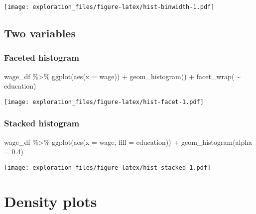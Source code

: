 \documentclass[
]{book}
\newenvironment{Shaded}{\begin{snugshade}}{\end{snugshade}}
\newcommand{\AttributeTok}[1]{\textcolor[rgb]{0.77,0.63,0.00}{#1}}
\newcommand{\FloatTok}[1]{\textcolor[rgb]{0.00,0.00,0.81}{#1}}
\newcommand{\FunctionTok}[1]{\textcolor[rgb]{0.00,0.00,0.00}{#1}}
\newcommand{\NormalTok}[1]{#1}
\newcommand{\SpecialCharTok}[1]{\textcolor[rgb]{0.00,0.00,0.00}{#1}}
\begin{document}
\texttt{[image: exploration\_files/figure-latex/hist-binwidth-1.pdf]}

\hypertarget{two-variables-1}{%
\section{Two variables}\label{two-variables-1}}

\hypertarget{faceted-histogram}{%
\subsection{Faceted histogram}\label{faceted-histogram}}

\begin{Shaded}
\begin{Highlighting}[]
\NormalTok{wage\_df }\SpecialCharTok{\%\textgreater{}\%} 
  \FunctionTok{ggplot}\NormalTok{(}\FunctionTok{aes}\NormalTok{(}\AttributeTok{x =}\NormalTok{ wage)) }\SpecialCharTok{+}
  \FunctionTok{geom\_histogram}\NormalTok{() }\SpecialCharTok{+}
  \FunctionTok{facet\_wrap}\NormalTok{( }\SpecialCharTok{\textasciitilde{}}\NormalTok{ education)}
\end{Highlighting}
\end{Shaded}

\texttt{[image: exploration\_files/figure-latex/hist-facet-1.pdf]}

\hypertarget{stacked-histogram}{%
\subsection{Stacked histogram}\label{stacked-histogram}}

\begin{Shaded}
\begin{Highlighting}[]
\NormalTok{wage\_df }\SpecialCharTok{\%\textgreater{}\%} 
  \FunctionTok{ggplot}\NormalTok{(}\FunctionTok{aes}\NormalTok{(}\AttributeTok{x =}\NormalTok{ wage, }\AttributeTok{fill =}\NormalTok{ education)) }\SpecialCharTok{+}
  \FunctionTok{geom\_histogram}\NormalTok{(}\AttributeTok{alpha =} \FloatTok{0.4}\NormalTok{)}
\end{Highlighting}
\end{Shaded}

\texttt{[image: exploration\_files/figure-latex/hist-stacked-1.pdf]}

\hypertarget{density}{%
\chapter{Density plots}\label{density}}
\end{document}

